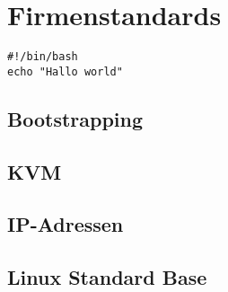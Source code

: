 \chapter{Firmenstandards}
\begin{verbatim}
#!/bin/bash
echo "Hallo world"
\end{verbatim}
\section{Bootstrapping}
\section{KVM}
\section{IP-Adressen}
\section{Linux Standard Base}
